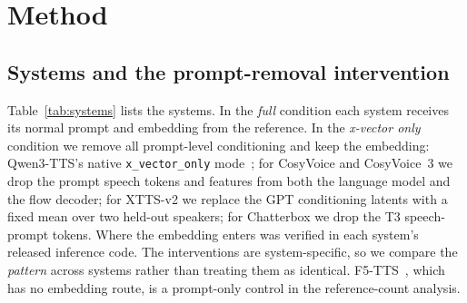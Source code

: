 \documentclass{Interspeech}
\begin{document}
\section{Method}
\label{sec:method}

\subsection{Systems and the prompt-removal intervention}
\label{sec:systems}

Table~\ref{tab:systems} lists the systems.
In the \emph{full} condition each system receives its normal prompt and embedding from the reference.
In the \emph{x-vector only} condition we remove all prompt-level conditioning and keep the embedding: Qwen3-TTS's native \texttt{x\_vector\_only} mode~\cite{qwen3tts}; for CosyVoice and CosyVoice~3 we drop the prompt speech tokens and features from both the language model and the flow decoder; for XTTS-v2 we replace the GPT conditioning latents with a fixed mean over two held-out speakers; for Chatterbox we drop the T3 speech-prompt tokens.
Where the embedding enters was verified in each system's released inference code.
The interventions are system-specific, so we compare the \emph{pattern} across systems rather than treating them as identical.
F5-TTS~\cite{f5tts}, which has no embedding route, is a prompt-only control in the reference-count analysis.

\begin{table}[t]
\centering
\caption{Systems and where their speaker embedding enters.}
\label{tab:systems}
\small
\setlength{\tabcolsep}{3pt}
\end{table}
\end{document}
